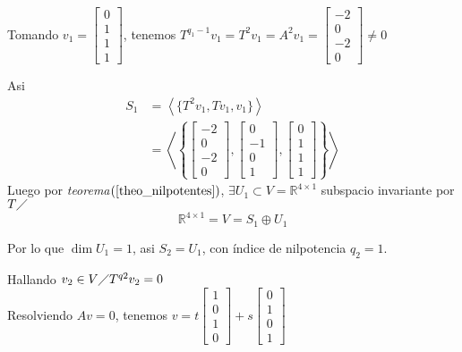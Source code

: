 \documentclass[10pt,a4paper]{article}
\begin{document}
Tomando $v_{1} = 
\begin{bmatrix}
	0	\\
	1	\\
	1	\\
	1
\end{bmatrix}
$, tenemos $T^{q_{1}-1}v_{1} = T^{2}v_{1} = A^{2}v_{1} = 
\begin{bmatrix}
	-2	\\
	0	\\
	-2	\\
	0
\end{bmatrix}\neq 0
$

Asi \begin{align*}
	S_{1} 	&= \left<\{T^{2}v_{1}, Tv_{1}, v_{1}\}\right>\\
			&=\left<\left\{
			\begin{bmatrix}
			-2	\\
			0	\\
			-2	\\
			0
			\end{bmatrix}, 
			\begin{bmatrix}
			0	\\
			-1	\\
			0	\\
			1
			\end{bmatrix},
			\begin{bmatrix}
			0	\\
			1	\\
			1	\\
			1
			\end{bmatrix}\right\}\right>
\end{align*}
Luego por \textit{teorema}$\left(\ref{theo_nilpotentes}\right)$, $\exists U_{1}\subset V = \mathbb{R}^{4\times 1}$ subspacio invariante por $T\diagup$
$$\mathbb{R}^{4\times 1} = V = S_{1}\oplus U_{1}$$

Por lo que $\dim U_{1} = 1$, asi $S_{2} = U_{1}$, con índice de nilpotencia $q_{2} = 1$.

Hallando $v_{2}\in V\diagup T^{q2}v_{2} = 0$\\
Resolviendo $Av = 0$, tenemos 
$v = t
\begin{bmatrix}
1	\\
0	\\
1	\\
0
\end{bmatrix}
+ s
\begin{bmatrix}
0	\\
1	\\
0	\\
1
\end{bmatrix}$
\end{document}
